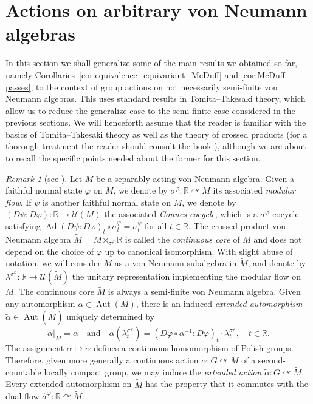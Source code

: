 \documentclass[11pt,a4paper]{article}
\theoremstyle{definition}
\theoremstyle{remark}
\newtheorem{remark}[theorem]{Remark}
\numberwithin{equation}{section}
\numberwithin{theorem}{section}
\renewcommand{\tilde}{\widetilde}
\begin{document}

\section{Actions on arbitrary von Neumann algebras}

In this section we shall generalize some of the main results we obtained so far, namely Corollaries~\ref{cor:equivalence_equivariant_McDuff} and \ref{cor:McDuff-passes}, to the context of group actions on not necessarily semi-finite von Neumann algebras.
This uses standard results in Tomita--Takesaki theory, which allow us to reduce the generalize case to the semi-finite case considered in the previous sections.
We will henceforth assume that the reader is familiar with the basics of Tomita--Takesaki theory as well as the theory of crossed products (for a thorough treatment the reader should consult the book \cite{Takesaki03}), although we are about to recall the specific points needed about the former for this section.

\begin{remark}[see {\cite[Chapters VIII, XII]{Takesaki03}}] \label{rem:tt-basics}
Let $M$ be a separably acting von Neumann algebra.
Given a faithful normal state $\varphi$ on $M$, we denote by $\sigma^\varphi: \mathbb{R}\curvearrowright M$ its associated \emph{modular flow}.
If $\psi$ is another faithful normal state on $M$, we denote by $(D\psi: D\varphi): \mathbb{R}\to\mathcal{U}(M)$ the associated \emph{Connes cocycle}, which is a $\sigma^\varphi$-cocycle satisfying $\operatorname{Ad}(D\psi: D\varphi)_t\circ\sigma^\varphi_t=\sigma^\psi_t$ for all $t\in\mathbb{R}$.
The crossed product von Neumann algebra $\tilde{M}=M\rtimes_{\sigma^\varphi}\mathbb{R}$ is called the \emph{continuous core} of $M$ and does not depend on the choice of $\varphi$ up to canonical isomorphism.
With slight abuse of notation, we will consider $M$ as a von Neumann subalgebra in $\tilde{M}$, and denote by $\lambda^{\sigma^\varphi}: \mathbb{R}\to\mathcal{U}(\tilde{M})$ the unitary representation implementing the modular flow on $M$.
The continuous core $\tilde{M}$ is always a semi-finite von Neumann algebra.
Given any automorphism $\alpha\in\operatorname{Aut}(M)$, there is an induced \emph{extended automorphism} $\tilde{\alpha}\in\operatorname{Aut}(\tilde{M})$ uniquely determined by
\[
\tilde{\alpha}|_M = \alpha \quad\text{and}\quad \tilde{\alpha}(\lambda^{\sigma^\varphi}_t)=(D \varphi\circ\alpha^{-1} : D\varphi)_t\cdot\lambda^{\sigma^\varphi}_t,\quad t\in\mathbb R.
\]
The assignment $\alpha\mapsto\tilde{\alpha}$ defines a continuous homomorphism of Polish groups.
Therefore, given more generally a continuous action $\alpha: G\curvearrowright M$ of a second-countable locally compact group, we may induce the \emph{extended action} $\tilde{\alpha}: G\curvearrowright\tilde{M}$.
Every extended automorphism on $\tilde{M}$ has the property that it commutes with the dual flow $\hat{\sigma}^\varphi: \mathbb{R}\curvearrowright\tilde{M}$.
\end{remark}
\end{document}
